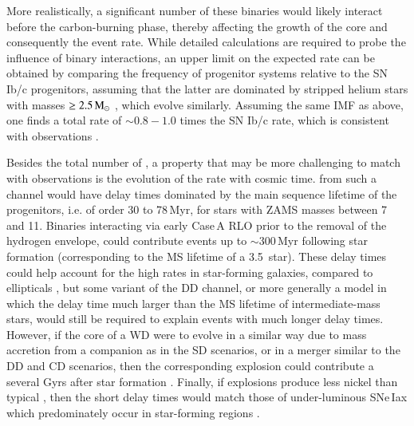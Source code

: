 \documentclass[twocolumn]{aa}
\begin{document}
 More realistically, a significant number of these binaries would likely interact before the carbon-burning phase, thereby affecting the growth of the core and consequently the event rate. While detailed  calculations are required to probe the influence  of binary interactions, an upper limit on the expected rate can be obtained by comparing  the frequency of progenitor systems  relative to  the SN Ib/c progenitors, assuming that the latter are dominated by stripped helium stars with masses $\ge 2.5\mathrm{\,M_\odot}$ \citep{Woosley:2019sdf}, which evolve similarly. Assuming the same IMF as above, one finds a total rate of $\sim 0.8-1.0$ times the SN Ib/c rate, which is consistent with observations \citep[][and references therein]{branch2017}. 


Besides the total number of \ias, a property that may be more challenging to match with observations is the evolution of the \ia rate with cosmic time. \ias from such a channel would have delay times dominated by the main sequence lifetime of the progenitors, i.e. of order 30 to 78\,Myr, for stars with ZAMS masses between 7 and 11\msun. Binaries interacting via early Case\,A RLO prior to the removal of the hydrogen envelope, could contribute events up to $\sim 300$\,Myr following star formation (corresponding to the MS lifetime of a 3.5\msun\ star). 
These delay times could help account for the high \ia rates in star-forming galaxies, compared to ellipticals \citep{Maoz:2010pz,claeys2014}, but some variant of the DD channel, or more generally a model in which the delay time much larger than the MS lifetime of intermediate-mass stars, would still be required to explain events with much longer delay times.  
 However,  if the \one core of a WD  were to evolve in a similar way due to 
mass accretion from a companion as in the SD scenarios, or in a merger similar to the DD and CD scenarios, then the corresponding explosion could contribute a \ia several Gyrs after star formation \citep[see also][and references therein]{Kashi:2011nm,chen2014b,Meng:2014qta,marquardt2015,Schwab:2015bma,Jones:2016asr,Schwab:2017epw,Schwab:2018cnb,kashyap2018,augustine2019,soker2019}. 
Finally, if \one explosions produce less nickel than typical \ias, then the short delay times would match those of under-luminous SNe\,Iax which predominately occur in star-forming regions \citep{Lyman:2013drq,Jha:2017gwq}. 
\end{document}
